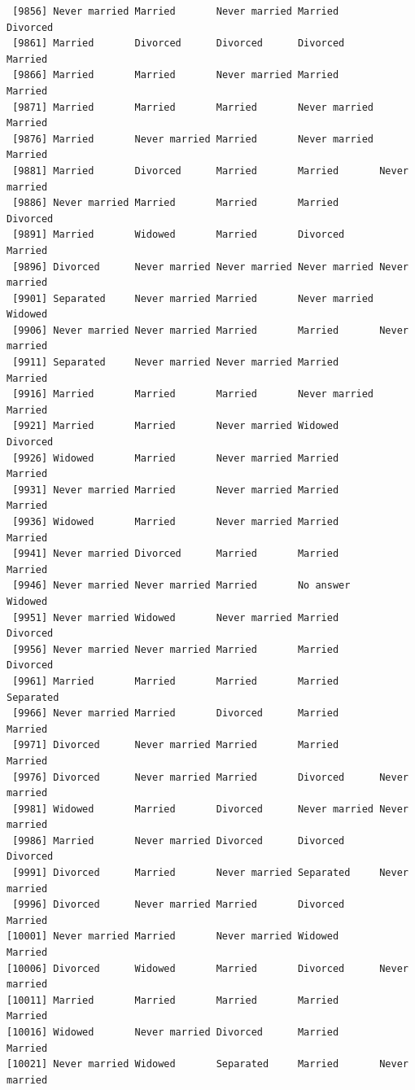 \documentclass[
  letterpaper,
  DIV=11,
  numbers=noendperiod,
  oneside]{scrartcl}
\begin{document}
\begin{verbatim}
 [9856] Never married Married       Never married Married       Divorced     
 [9861] Married       Divorced      Divorced      Divorced      Married      
 [9866] Married       Married       Never married Married       Married      
 [9871] Married       Married       Married       Never married Married      
 [9876] Married       Never married Married       Never married Married      
 [9881] Married       Divorced      Married       Married       Never married
 [9886] Never married Married       Married       Married       Divorced     
 [9891] Married       Widowed       Married       Divorced      Married      
 [9896] Divorced      Never married Never married Never married Never married
 [9901] Separated     Never married Married       Never married Widowed      
 [9906] Never married Never married Married       Married       Never married
 [9911] Separated     Never married Never married Married       Married      
 [9916] Married       Married       Married       Never married Married      
 [9921] Married       Married       Never married Widowed       Divorced     
 [9926] Widowed       Married       Never married Married       Married      
 [9931] Never married Married       Never married Married       Married      
 [9936] Widowed       Married       Never married Married       Married      
 [9941] Never married Divorced      Married       Married       Married      
 [9946] Never married Never married Married       No answer     Widowed      
 [9951] Never married Widowed       Never married Married       Divorced     
 [9956] Never married Never married Married       Married       Divorced     
 [9961] Married       Married       Married       Married       Separated    
 [9966] Never married Married       Divorced      Married       Married      
 [9971] Divorced      Never married Married       Married       Married      
 [9976] Divorced      Never married Married       Divorced      Never married
 [9981] Widowed       Married       Divorced      Never married Never married
 [9986] Married       Never married Divorced      Divorced      Divorced     
 [9991] Divorced      Married       Never married Separated     Never married
 [9996] Divorced      Never married Married       Divorced      Married      
[10001] Never married Married       Never married Widowed       Married      
[10006] Divorced      Widowed       Married       Divorced      Never married
[10011] Married       Married       Married       Married       Married      
[10016] Widowed       Never married Divorced      Married       Married      
[10021] Never married Widowed       Separated     Married       Never married

\end{verbatim}
\end{document}
